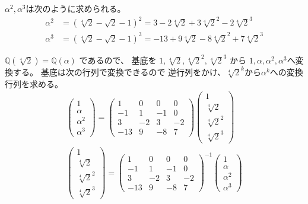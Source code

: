 \documentclass[12pt,b5paper]{ltjsarticle}
\begin{document}
\begin{enumerate}
      $\alpha^{2},\alpha^{3}$は次のように求められる。
      \begin{align}
       \alpha^{2}
        &= (\sqrt[4]{2} - \sqrt{2} -1)^{2}
        = 3 -2 \sqrt[4]{2} + 3 \sqrt[4]{2}^{2} - 2 \sqrt[4]{2}^{3}\\
       \alpha^{3}
       &=  (\sqrt[4]{2} - \sqrt{2} -1)^{3}
       =  -13 +9 \sqrt[4]{2} - 8 \sqrt[4]{2}^{2} + 7 \sqrt[4]{2}^{3}
      \end{align}

      
      $\mathbb{Q}(\sqrt[4]{2})=\mathbb{Q}(\alpha)$
      であるので、
      基底を
      $1,\sqrt[4]{2},\sqrt[4]{2}^{2},\sqrt[4]{2}^{3}$
      から
      $1,\alpha,\alpha^{2},\alpha^{3}$へ変換する。
      基底は次の行列で変換できるので
      逆行列をかけ、$\sqrt[4]{2}^{k}$から$\alpha^{k}$への変換行列を求める。
      \begin{align}
       \begin{pmatrix}
        1 \\ \alpha \\ \alpha^{2} \\ \alpha^{3}
       \end{pmatrix}
       =
       \begin{pmatrix}
        1 & 0 & 0 & 0 \\
        -1 & 1 & -1 & 0 \\
        3 & -2 & 3 & -2 \\
        -13 & 9 & -8 & 7
       \end{pmatrix}
       \begin{pmatrix}
        1 \\ \sqrt[4]{2} \\ \sqrt[4]{2}^{2} \\ \sqrt[4]{2}^{3}
       \end{pmatrix}
       \\
       \begin{pmatrix}
        1 \\ \sqrt[4]{2} \\ \sqrt[4]{2}^{2} \\ \sqrt[4]{2}^{3}
       \end{pmatrix}
       =
       \begin{pmatrix}
        1 & 0 & 0 & 0 \\
        -1 & 1 & -1 & 0 \\
        3 & -2 & 3 & -2 \\
        -13 & 9 & -8 & 7
       \end{pmatrix}
       ^{-1}
       \begin{pmatrix}
        1 \\ \alpha \\ \alpha^{2} \\ \alpha^{3}
       \end{pmatrix}
      \end{align}
      

\end{enumerate}
\end{document}
